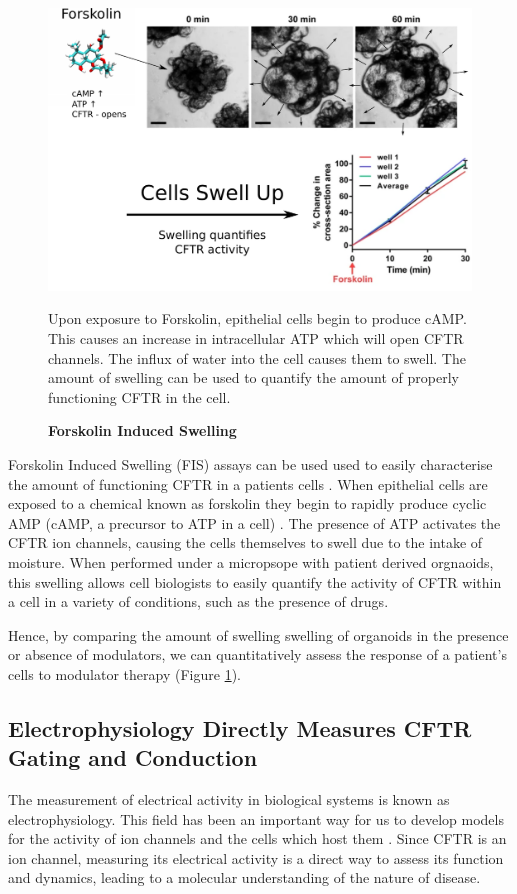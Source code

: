 \begin{figure}
	\label{FIS_figure}
	\begin{center}
	\includegraphics[width=1\textwidth]{figures/FIS_demo.pdf}
	\end{center}
	\captionsetup{singlelinecheck = false, justification=raggedright}
	\caption[Forskolin Induced Swelling] {\textbf{Forskolin Induced Swelling}}{Upon exposure to Forskolin, epithelial cells begin to produce cAMP. This causes an increase in intracellular ATP which will open CFTR channels. The influx of water into the cell causes them to swell. The amount of swelling can be used to quantify the amount of properly functioning CFTR in the cell.} 
\end{figure}
Forskolin Induced Swelling (FIS) assays can be used used to easily characterise the amount of functioning CFTR in a patients cells \cite{dekkers2013}. When epithelial cells are exposed to a chemical known as forskolin they begin to rapidly produce cyclic AMP (cAMP, a precursor to ATP in a cell) \cite{bonora2012}. The presence of ATP activates the CFTR ion channels, causing the cells themselves to swell due to the intake of moisture. When performed under a micropsope with patient derived orgnaoids, this swelling allows cell biologists to easily quantify the activity of CFTR within a cell in a variety of conditions, such as the presence of drugs.

Hence, by comparing the amount of swelling swelling of organoids in the presence or absence of modulators, we can quantitatively assess the response of a patient's cells to modulator therapy (Figure \ref{FIS_figure}). 

\subsection{Electrophysiology Directly Measures CFTR Gating and Conduction}
The measurement of electrical activity in biological systems is known as electrophysiology. This field has been an important way for us to develop models for the activity of ion channels and the cells which host them \cite{aidley1996}. Since CFTR is an ion channel, measuring its electrical activity is a direct way to assess its function and dynamics, leading to a molecular understanding of the nature of disease. 

